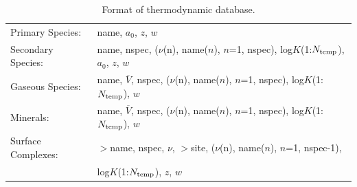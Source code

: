 \begin{table}[h]\centering
\caption{Format of thermodynamic database.}\label{tdatabase}
\vspace{3mm}
\begin{tabular}{ll}
\hline
Primary Species: & name, $a_0$, $z$, $w$\\
Secondary Species: & name, nspec, ($\nu$(n), name($n$), $n$=1, nspec), log$K$(1:$N_{\rm temp}$), $a_0$, $z$, $w$\\
Gaseous Species: & name, $\overline V$, nspec, ($\nu$(n), name($n$), $n$=1, nspec), log$K$(1:$N_{\rm temp}$), $w$ \\
Minerals: & name, $\overline V$, nspec, ($\nu$(n), name($n$), $n$=1, nspec), log$K$(1:$N_{\rm temp}$), $w$\\
Surface Complexes: & $>$name, nspec, $\nu$, $>$site, 
($\nu$(n), name($n$), $n$=1, nspec-1), \\
&\hspace{3in} log$K$(1:$N_{\rm temp}$), $z$, $w$\\
\hline
\end{tabular}
\end{table}

